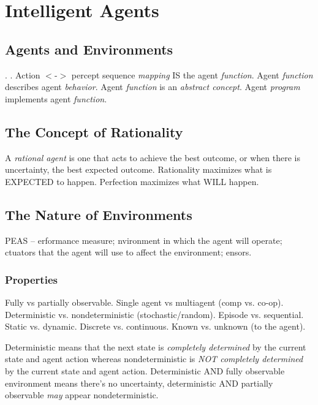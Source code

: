 \documentclass[exam={Midterm},color=true]{cs581exam}
\begin{document}
\section{Intelligent Agents}\label{sec:intelligent-agents}
\subsection{Agents and Environments}\label{subsec:2.1}
.
.
Action $<$-$>$ percept sequence \emph{mapping} IS the agent \emph{function}.
Agent \emph{function} describes agent \emph{behavior}.
Agent \emph{function} is an \emph{abstract concept}.
Agent \emph{program} implements agent \emph{function}.

\subsection{The Concept of Rationality}\label{subsec:2.2}
A \emph{rational agent} is one that acts to achieve the best outcome, or when there is uncertainty, the best expected outcome.
Rationality maximizes what is EXPECTED to happen.
Perfection maximizes what WILL happen.
%
\subsection{The Nature of Environments}\label{subsec:2.3}
PEAS -- \Peas{}erformance measure;
\pEas{}nvironment in which the agent will operate;
\peAs{}ctuators that the agent will use to affect the environment;
\peaS{}ensors.
\subsubsection{Properties}\label{subsubsec:properties}
Fully vs partially observable.
Single agent vs multiagent (comp vs. co-op).
Deterministic vs. nondeterministic (stochastic/random).
Episode vs. sequential.
Static vs. dynamic.
Discrete vs. continuous.
Known vs. unknown (to the agent).

Deterministic means that the next state is \emph{completely determined} by the current state and agent action
whereas nondeterministic is \emph{NOT completely determined} by the current state and agent action.
Deterministic AND fully observable environment means there's no uncertainty, deterministic AND partially observable \textit{may} appear nondeterministic.
\end{document}
